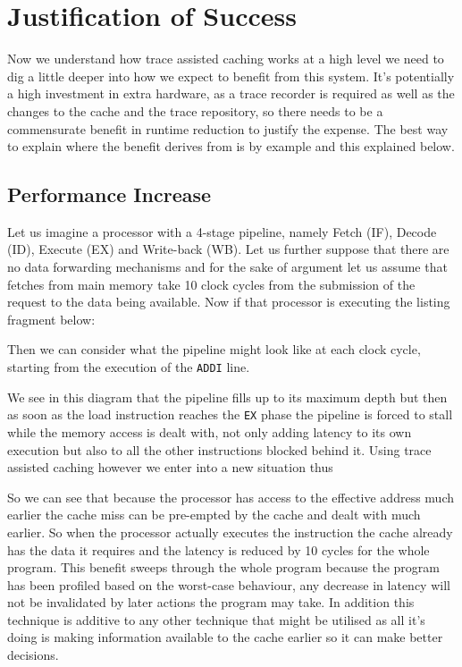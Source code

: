 \section{Justification of Success}

Now we understand how trace assisted caching works at a high level we need to dig a little deeper into how we expect to benefit from this system. It's potentially a high investment in extra hardware, as a trace recorder is required as well as the changes to the cache and the trace repository, so there needs to be a commensurate benefit in runtime reduction to justify the expense. The best way to explain where the benefit derives from is by example and this explained below.

\subsection{Performance Increase}

Let us imagine a processor with a 4-stage pipeline, namely Fetch (IF), Decode (ID), Execute (EX) and Write-back (WB). Let us further suppose that there are no data forwarding mechanisms and for the sake of argument let us assume that fetches from main memory take 10 clock cycles from the submission of the request to the data being available. Now if that processor is executing the listing fragment below:



Then we can consider what the pipeline might look like at each clock cycle, starting from the execution of the \texttt{ADDI} line.


We see in this diagram that the pipeline fills up to its maximum depth but then as soon as the load instruction reaches the \texttt{EX} phase the pipeline is forced to stall while the memory access is dealt with, not only adding latency to its own execution but also to all the other instructions blocked behind it. Using trace assisted caching however we enter into a new situation thus


So we can see that because the processor has access to the effective address much earlier the cache miss can be pre-empted by the cache and dealt with much earlier. So when the processor actually executes the instruction the cache already has the data it requires and the latency is reduced by 10 cycles for the whole program. This benefit sweeps through the whole program because the program has been profiled based on the worst-case behaviour, any decrease in latency will not be invalidated by later actions the program may take. In addition this technique is additive to any other technique that might be utilised as all it's doing is making information available to the cache earlier so it can make better decisions. 

